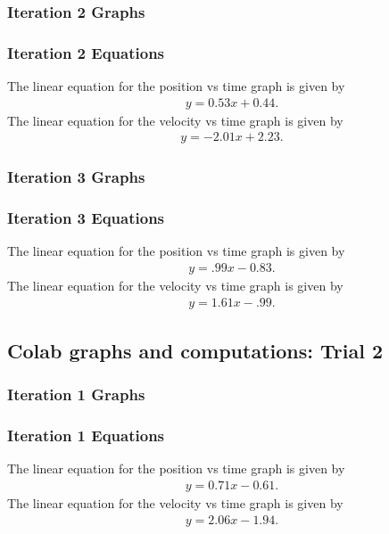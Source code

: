 \documentclass{report}
\begin{document}
   \bigbreak \noindent 
    \subsubsection{Iteration 2 Graphs}
    \bigbreak \noindent 
    \fc{}
    \bigbreak \noindent 
    \subsubsection{Iteration 2 Equations}
    The linear equation for the position vs time graph is given by
    \begin{align*}
        y = 0.53x+0.44
    .\end{align*}
    \bigbreak \noindent 
    The linear equation for the velocity vs time graph is given by
    \begin{align*}
        y=-2.01x+2.23
    .\end{align*}

   \bigbreak \noindent 
    \subsubsection{Iteration 3 Graphs}
    \fc{}


    \bigbreak \noindent 
    \subsubsection{Iteration 3 Equations}
    \bigbreak \noindent 
    The linear equation for the position vs time graph is given by
    \begin{align*}
        y=.99x-0.83
    .\end{align*}
    \bigbreak \noindent 
    The linear equation for the velocity vs time graph is given by
    \begin{align*}
        y=1.61x-.99
    .\end{align*}


    \pagebreak 
    \subsection{Colab graphs and computations: Trial 2}
    \bigbreak \noindent 
    \subsubsection{Iteration 1 Graphs}
    \fc{}


    \bigbreak \noindent 
    \subsubsection{Iteration 1 Equations}
    \bigbreak \noindent 
    The linear equation for the position vs time graph is given by
    \begin{align*}
        y=0.71x-0.61
    .\end{align*}
    \bigbreak \noindent 
    The linear equation for the velocity vs time graph is given by
    \begin{align*}
        y=2.06x-1.94
    .\end{align*}
\end{document}
